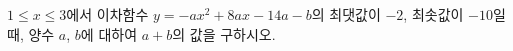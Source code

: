 $1\le x\le 3$에서 이차함수 $y=-ax^2+8ax-14a-b$의 최댓값이 $-2$, 최솟값이 $-10$일 때, 양수 $a$, $b$에 대하여 $a+b$의 값을 구하시오.

